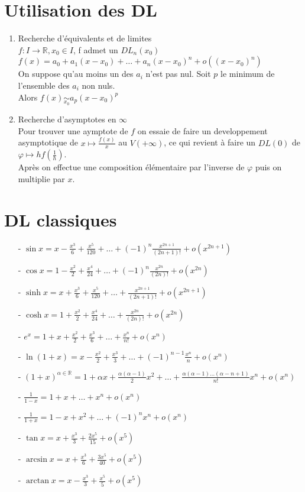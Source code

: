\documentclass[fleqn]{article}
\theoremstyle{definition} \newtheorem*{defi}{D\'efinition}
\theoremstyle{definition} \newtheorem*{theo}{Th\'eor\`eme}
\theoremstyle{definition} \newtheorem*{prop}{Propri\'et\'e}
\theoremstyle{definition} \newtheorem*{coro}{Corollaire}
\theoremstyle{remark} \newtheorem*{rqs}{Remarques}
\begin{document}
\section{Utilisation des DL}
\begin{enumerate}
	\item Recherche d'\'equivalents et de limites \\
		$f: I \rightarrow \mathbb{R}, x_0 \in I$, f admet un $DL_n(x_0)$ \\
		$f(x) =  a_0 + a_1(x-x_0) + \hdots + a_n(x-x_0)^n + o((x-x_0)^n)$ \\
		On suppose qu'au moins un des $a_i$ n'est pas nul. Soit $p$ le minimum de l'ensemble des $a_i$ non nuls. \\
		Alors $f(x) \underset{x_0}{\sim} a_p(x-x_0)^p$
	\item Recherche d'asymptotes en $\infty$\\
		Pour trouver une aymptote de $f$ on essaie de faire un developpement asymptotique de $x \mapsto \frac{f(x)}{x}$ au $V(+\infty)$,
		ce qui revient \`a faire un $DL(0)$ de $\varphi \mapsto h f(\frac{1}{h})$. \\
		Apr\`es on effectue une composition \'el\'ementaire par l'inverse de $\varphi$ puis on multiplie par $x$.
\end{enumerate}

\section{DL classiques}
\begin{itemize}
	\item [-] $\sin x = x - \frac{x^3}{6} + \frac{x^5}{120} + \hdots + (-1)^n \frac{x^{2n+1}}{(2n+1)!} + o(x^{2n+1})$
	\item [-] $\cos x = 1 - \frac{x^2}{2} + \frac{x^4}{24} + \hdots + (-1)^n \frac{x^{2n}}{(2n)!} + o(x^{2n})$
	\item [-] $\sinh x = x + \frac{x^3}{6} + \frac{x^5}{120} + \hdots + \frac{x^{2n+1}}{(2n+1)!} + o(x^{2n+1})$
	\item [-] $\cosh x = 1 + \frac{x^2}{2} + \frac{x^4}{24} + \hdots + \frac{x^{2n}}{(2n)!} + o(x^{2n})$
	\item [-] $e^x = 1 + x + \frac{x^2}{2} + \frac{x^3}{6} + \hdots + \frac{x^n}{n!} + o(x^n)$
	\item [-] $\ln(1+x) = x - \frac{x^2}{2} + \frac{x^3}{3} + \hdots + (-1)^{n-1} \frac{x^n}{n} + o(x^n)$
	\item [-] $(1+x)^{\alpha \in \mathbb{R}} = 1 + \alpha x + \frac{\alpha(\alpha -1)}{2} x^2 + \hdots + \frac{\alpha(\alpha-1)\hdots
		(\alpha-n+1)}{n!} x^n + o(x^n)$
	\item [-] $\frac{1}{1-x} = 1 + x + \hdots + x^n + o(x^n)$
	\item [-] $\frac{1}{1+x} = 1 - x + x^2 + \hdots + (-1)^n x^n + o(x^n)$
	\item [-] $\tan x = x + \frac{x^3}{3} + \frac{2x^5}{15} + o(x^5)$
	\item [-] $\arcsin x = x + \frac{x^3}{6} + \frac{3x^5}{40} + o(x^5)$
	\item [-] $\arctan x = x - \frac{x^3}{3} + \frac{x^5}{5} + o(x^5)$
\end{itemize}
\end{document}
